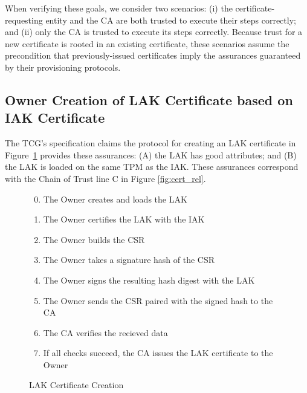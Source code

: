 \documentclass[runningheads]{llncs}
\begin{document}
When verifying these goals, we consider two scenarios: (i) the
certificate-requesting entity and the CA are both trusted to execute
their steps correctly; and (ii) only the CA is trusted to execute its
steps correctly.  Because trust for a new certificate is rooted in an
existing certificate, these scenarios assume the precondition that
previously-issued certificates imply the assurances guaranteed by
their provisioning protocols.

\subsection{Owner Creation of LAK Certificate based on IAK Certificate}

The TCG's specification claims the protocol for creating an LAK
certificate in Figure~\ref{fig:lak-certificate-creation} provides
these assurances: (A) the LAK has good attributes; and (B) the LAK is
loaded on the same TPM as the IAK. These assurances correspond with
the Chain of Trust line C in Figure \ref{fig:cert_rel}.

\begin{figure}[hpbt]
\begin{enumerate}[itemsep=0pt,parsep=0pt,partopsep=0pt]
  \setcounter{enumi}{-1}
  \item The Owner creates and loads the LAK
  \item The Owner certifies the LAK with the IAK
  \item The Owner builds the CSR%
  \item The Owner takes a signature hash of the CSR
  \item The Owner signs the resulting hash digest with the LAK
  \item The Owner sends the CSR paired with the signed hash to the CA
  \item The CA verifies the recieved data%
  \item If all checks succeed, the CA issues the LAK certificate to the Owner
  \end{enumerate}
  \caption{LAK Certificate Creation}
  \label{fig:lak-certificate-creation}
\end{figure}
\end{document}
